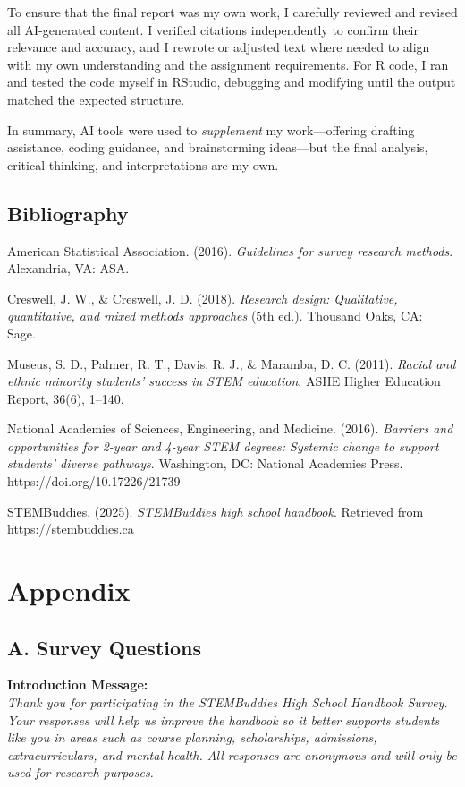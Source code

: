 \documentclass[
  letterpaper,
  DIV=11,
  numbers=noendperiod]{scrartcl}
\begin{document}
To ensure that the final report was my own work, I carefully reviewed
and revised all AI-generated content. I verified citations independently
to confirm their relevance and accuracy, and I rewrote or adjusted text
where needed to align with my own understanding and the assignment
requirements. For R code, I ran and tested the code myself in RStudio,
debugging and modifying until the output matched the expected structure.

In summary, AI tools were used to \emph{supplement} my work---offering
drafting assistance, coding guidance, and brainstorming ideas---but the
final analysis, critical thinking, and interpretations are my own.

\subsection{Bibliography}\label{bibliography}

American Statistical Association. (2016). \emph{Guidelines for survey
research methods}. Alexandria, VA: ASA.~~

Creswell, J. W., \& Creswell, J. D. (2018). \emph{Research design:
Qualitative, quantitative, and mixed methods approaches} (5th ed.).
Thousand Oaks, CA: Sage.~~

Museus, S. D., Palmer, R. T., Davis, R. J., \& Maramba, D. C. (2011).
\emph{Racial and ethnic minority students' success in STEM education}.
ASHE Higher Education Report, 36(6), 1--140.~~

National Academies of Sciences, Engineering, and Medicine. (2016).
\emph{Barriers and opportunities for 2-year and 4-year STEM degrees:
Systemic change to support students' diverse pathways}. Washington, DC:
National Academies Press. https://doi.org/10.17226/21739~~

STEMBuddies. (2025). \emph{STEMBuddies high school handbook}. Retrieved
from https://stembuddies.ca

\section{Appendix}\label{appendix}

\subsection{A. Survey Questions}\label{a.-survey-questions}

\textbf{Introduction Message:}\\
\emph{Thank you for participating in the STEMBuddies High School
Handbook Survey. Your responses will help us improve the handbook so it
better supports students like you in areas such as course planning,
scholarships, admissions, extracurriculars, and mental health. All
responses are anonymous and will only be used for research purposes.}
\end{document}
